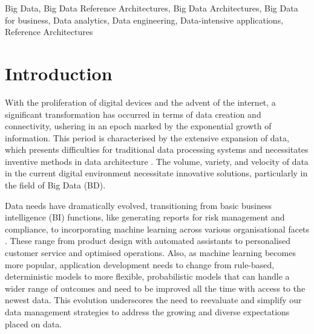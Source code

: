 \documentclass{ieeeaccess}
\begin{document}

\begin{keywords}

  Big Data, Big Data Reference Architectures, Big Data Architectures, Big Data for business, Data analytics, Data engineering, Data-intensive applications, Reference Architectures

\end{keywords}

\titlepgskip=-15pt

\maketitle

\section{Introduction}

\label{sec:introduction} 

With the proliferation of digital devices and the advent of the internet, a significant transformation has occurred in terms of data creation and connectivity, ushering in an epoch marked by the exponential growth of information. This period is characterised by the extensive expansion of data, which presents difficulties for traditional data processing systems and necessitates inventive methods in data architecture \cite{AtaeiACIS, ataei2022state}. The volume, variety, and velocity of data in the current digital environment necessitate innovative solutions, particularly in the field of Big Data (BD).

Data needs have dramatically evolved, transitioning from basic business intelligence (BI) functions, like generating reports for risk management and compliance, to incorporating machine learning across various organisational facets \cite{ataei2023towards}. These range from product design with automated assistants to personalised customer service and optimised operations.  Also, as machine learning becomes more popular, application development needs to change from rule-based, deterministic models to more flexible, probabilistic models that can handle a wider range of outcomes and need to be improved all the time with access to the newest data. This evolution underscores the need to reevaluate and simplify our data management strategies to address the growing and diverse expectations placed on data.
\end{document}
